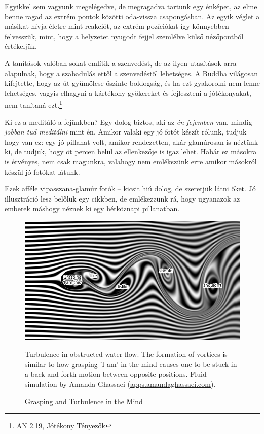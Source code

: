 Egyikkel sem vagyunk megelégedve, de megragadva tartunk egy énképet, az
elme benne ragad az extrém pontok közötti oda-vissza csapongásban. Az
egyik véglet a másikat hívja életre mint reakciót, az extrém pozíciókat
így könnyebben felvesszük, mint, hogy a helyzetet nyugodt fejjel
szemlélve külső nézőpontból értékeljük.

A tanítások valóban sokat említik a szenvedést, de az ilyen utasítások
arra alapulnak, hogy a szabadulás ettől a szenvedéstől lehetséges. A
Buddha világosan kifejtette, hogy az út gyümölcse őszinte boldogság, és
ha ezt gyakorolni nem lenne lehetséges, vagyis elhagyni a kártékony
gyökereket és fejleszteni a jótékonyakat, nem tanítaná ezt.\footnote{\href{https://suttacentral.net/an2.11-20/en/thanissaro}{AN
  2.19}, Jótékony Tényezők}

Ki ez a meditáló a fejünkben? Egy dolog biztos, aki az \emph{én
fejemben} van, mindig \emph{jobban tud meditálni} mint én. Amikor valaki
egy jó fotót készít rólunk, tudjuk hogy van ez: egy jó pillanat volt,
amikor rendezetten, akár glamúrosan is néztünk ki, de tudjuk, hogy öt
percen belül az ellenkezője is igaz lehet. Habár ez másokra is érvényes,
nem csak magunkra, valahogy nem emlékszünk erre amikor másokról készül
jó fotókat látunk.

Ezek afféle vipasszana-glamúr fotók -- kicsit hiú dolog, de szeretjük
látni őket. Jó illusztráció lesz belőlük egy cikkben, de emlékezzünk rá,
hogy ugyanazok az emberek máshogy néznek ki egy hétköznapi pillanatban.

\clearpage

\null\vfill

\begin{figure}[h]
\caption{Grasping and Turbulence in the Mind}\label{fig-grasping-turbulence}
\hspace*{-9mm}%
\includegraphics[width=\linewidth+18mm]{./manuscript/tex/diagrams/grasping-turbulence.pdf}

\bigskip

{\small
Turbulence in obstructed water flow.
The formation of vortices is similar to how grasping 'I am' in the mind
causes one to be stuck in a back-and-forth motion between opposite positions.
Fluid simulation by Amanda Ghassaei (\href{http://apps.amandaghassaei.com/VortexShedding/}{apps.amandaghassaei.com}).
\par}
\end{figure}

